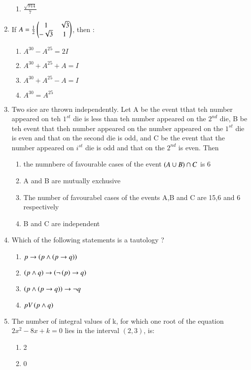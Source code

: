 \documentclass[journal]{IEEEtran}
\begin{document}
\begin{enumerate}
\begin{enumerate}
			\item $\frac{\sqrt{914}}{7}$
		\end{enumerate}
	\item If $A=\frac{1}{2}\begin{pmatrix}1&\sqrt{3}\\-\sqrt{3}&1\end{pmatrix}$, then :
		\begin{enumerate}
			\item $A^{30}-A^{25}=2I$
			\item $A^{30}+A^{25}+A=I$
			\item $A^{30}+A^{25}-A=I$
	                \item $A^{30}=A^{25}$
        	\end{enumerate}
	\item Two sice are thrown independently. Let A be the event tthat teh number appeared on teh $1^{st}$ die is less than teh number appeared on the $2^{nd}$ die, B be teh event that theh number appeared on the number appeared on the $1^{st}$ die is even and that on the second die is odd, and C be the event that the number appeared on $i^{st}$ die is odd and that on the $2^{nd}$ is even. Then
		\begin{enumerate}
			\item the numnbere of favourable cases of the event $\left(A \cup B\right)\cap C$ is 6
			\item A and B are mutually exchusive 
			\item The number of favourabel cases of the events A,B and C are 15,6 and 6 respectively 
			\item B and C are independent
        	\end{enumerate}	
	\item Which of the following statements is a tautology ?
		\begin{enumerate}
			\item $p \rightarrow \left(p\wedge \left(p \rightarrow q\right)\right)$
			\item $\left(p\wedge q\right)\rightarrow \left(\neg\left(p\right)\rightarrow q\right)$
			\item $\left(p\wedge \left(p \rightarrow q\right)\right)\rightarrow \neg q$
			\item $p V \left(p \wedge q\right)$
        	\end{enumerate}
	\item The number of integral values of k, for which one root of the equation $2x^2-8x+k=0$ lies in the interval $(2,3)$, is:
		\begin{enumerate}
			\item 2
			\item 0

\end{enumerate}
\end{enumerate}
\end{document}
